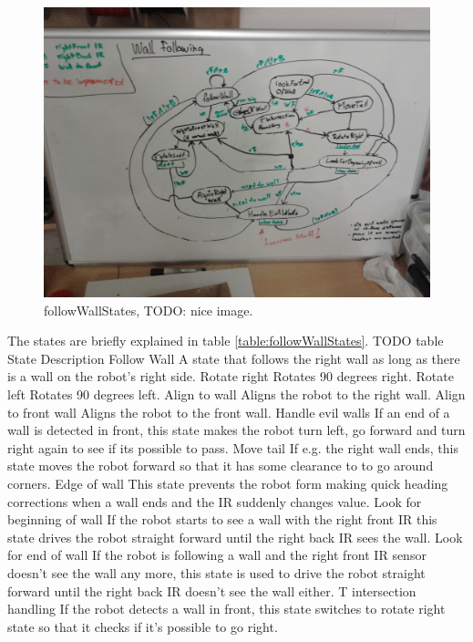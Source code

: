\begin{figure}[h]
    \begin{centering}
   	 \includegraphics[scale=0.15]{figures/followWallStates.jpg}
   	 \caption{followWallStates, TODO: nice image.}\label{fig:followWallStates}
    \end{centering}
\end{figure}

The states are briefly explained in table \ref{table:followWallStates}. 
TODO table
State
Description
Follow Wall	A state that follows the right wall as long as there is a wall on the robot’s right side.
Rotate right	Rotates 90 degrees right.
Rotate left	Rotates 90 degrees left.
Align to wall	Aligns the robot to the right wall.
Align to front wall	Aligns the robot to the front wall.
Handle evil walls	If an end of a wall is detected in front, this state makes the robot turn left, go forward and turn right again to see if its possible to pass.
Move tail	If e.g. the right wall ends, this state moves the robot forward so that it has some clearance to to go around corners.
Edge of wall	This state prevents the robot form making quick heading corrections when a wall ends and the IR suddenly changes value.
Look for beginning of wall	If the robot starts to see a wall with the right front IR this state drives the robot straight forward until the right back IR sees the wall. 
Look for end of wall	If the robot is following a wall and the right front IR sensor doesn’t see the wall any more, this state is used to drive the robot straight forward until the right back IR doesn’t see the wall either.
T intersection handling	If the robot detects a wall in front, this state switches to rotate right state so that it checks if it’s possible to go right.


